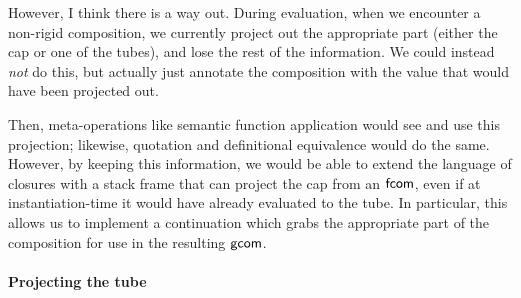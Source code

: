 \documentclass{article}
\begin{document}
However, I think there is a way out. During evaluation, when we encounter a
non-rigid composition, we currently project out the appropriate part (either the
cap or one of the tubes), and lose the rest of the information. We could instead \emph{not} do this, but actually just annotate the composition with the value that would have been projected out.

Then, meta-operations like semantic function application would see and use this
projection; likewise, quotation and definitional equivalence would do the same.
However, by keeping this information, we would be able to extend the language
of closures with a stack frame that can project the cap from an
$\mathsf{fcom}$, even if at instantiation-time it would have already evaluated
to the tube. In particular, this allows us to implement a continuation which
grabs the appropriate part of the composition for use in the resulting
$\mathsf{gcom}$.

\paragraph{Projecting the tube}
\end{document}

